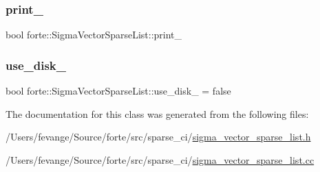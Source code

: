 \subsubsection{\texorpdfstring{print\+\_\+}{print\_}}
{\footnotesize\ttfamily bool forte\+::\+Sigma\+Vector\+Sparse\+List\+::print\+\_\+\hspace{0.3cm}{\ttfamily [protected]}}

\mbox{\label{classforte_1_1_sigma_vector_sparse_list_a6d3d86b1e74d0425575d6dcf10b8e138}} 
\subsubsection{\texorpdfstring{use\+\_\+disk\+\_\+}{use\_disk\_}}
{\footnotesize\ttfamily bool forte\+::\+Sigma\+Vector\+Sparse\+List\+::use\+\_\+disk\+\_\+ = false\hspace{0.3cm}{\ttfamily [protected]}}



The documentation for this class was generated from the following files\+:\begin{DoxyCompactItemize}
\item 
/\+Users/fevange/\+Source/forte/src/sparse\+\_\+ci/\mbox{\hyperlink{sigma__vector__sparse__list_8h}{sigma\+\_\+vector\+\_\+sparse\+\_\+list.\+h}}\item 
/\+Users/fevange/\+Source/forte/src/sparse\+\_\+ci/\mbox{\hyperlink{sigma__vector__sparse__list_8cc}{sigma\+\_\+vector\+\_\+sparse\+\_\+list.\+cc}}\end{DoxyCompactItemize}
